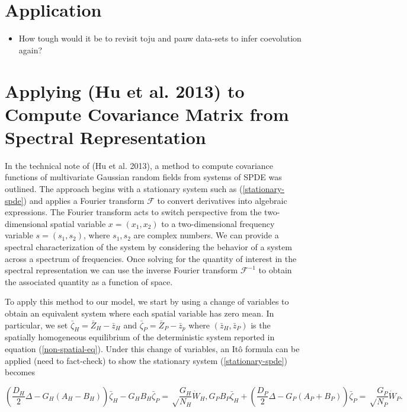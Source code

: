 \documentclass{article}
\begin{document}
\hypertarget{application}{%
\section{Application}\label{application}}

\begin{itemize}
\tightlist
\item
  How tough would it be to revisit toju and pauw data-sets to infer
  coevolution again?
\end{itemize}

\newpage

\hypertarget{applying-hu2013multivariate-to-compute-covariance-matrix-from-spectral-representation}{%
\section{Applying (Hu et al. 2013) to Compute Covariance Matrix from
Spectral
Representation}\label{applying-hu2013multivariate-to-compute-covariance-matrix-from-spectral-representation}}

In the technical note of (Hu et al. 2013), a method to compute
covariance functions of multivariate Gaussian random fields from systems
of SPDE was outlined. The approach begins with a stationary system such
as (\ref{stationary-spde}) and applies a Fourier transform
\(\mathcal F\) to convert derivatives into algebraic expressions. The
Fourier transform acts to switch perspective from the two-dimensional
spatial variable \(x=(x_1,x_2)\) to a two-dimensional frequency variable
\(s=(s_1,s_2)\), where \(s_1,s_2\) are complex numbers. We can provide a
spectral characterization of the system by considering the behavior of a
system across a spectrum of frequencies. Once solving for the quantity
of interest in the spectral representation we can use the inverse
Fourier transform \(\mathcal F^{-1}\) to obtain the associated quantity
as a function of space.

To apply this method to our model, we start by using a change of
variables to obtain an equivalent system where each spatial variable has
zero mean. In particular, we set \(\bar\zeta_H=\bar Z_H-\bar z_H\) and
\(\bar\zeta_P=\bar Z_P-\bar z_p\) where \((\bar z_H,\bar z_P)\) is the
spatially homogeneous equilibrium of the deterministic system reported
in equation (\ref{non-spatial-eq}). Under this change of variables, an
Itô formula can be applied (need to fact-check) to show the stationary
system (\ref{stationary-spde}) becomes

\begin{subequations}
  \begin{equation}
    \left(\frac{D_H}{2}\Delta-G_H(A_H-B_H)\right)\bar\zeta_H-G_HB_H\bar\zeta_P=\sqrt\frac{G_H}{N_H}\dot W_H,
  \end{equation}
  \begin{equation}
    G_PB_P\bar \zeta_H+\left(\frac{D_P}{2}\Delta-G_P(A_P+B_P)\right)\bar\zeta_P=\sqrt\frac{G_P}{N_P}\dot W_P.
  \end{equation}
\end{subequations}
\end{document}
